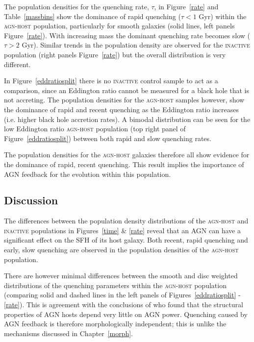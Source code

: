 The population densities for the quenching rate, $\tau$, in Figure~\ref{rate} and Table~\ref{massbins} show the dominance of rapid quenching ($\tau < 1$ Gyr) within the \textsc{agn-host} population, particularly for smooth galaxies (solid lines, left panels Figure~\ref{rate}). With increasing mass the dominant quenching rate becomes slow ($\tau > 2$ Gyr). Similar trends in the population density are observed for the \textsc{inactive} population (right panels Figure~\ref{rate}) but the overall distribution is very different. 

In Figure~\ref{eddratiosplit} there is no \textsc{inactive} control sample to act as a comparison, since an Eddington ratio cannot be measured for a black hole that is not accreting. The population densities for the \textsc{agn-host} samples however, show the dominance of rapid and recent quenching as the Eddington ratio increases (i.e. higher black hole accretion rates). A bimodal distribution can be seen for the low Eddington ratio \textsc{agn-host} population (top right panel of Figure~\ref{eddratiosplit}) between both rapid and slow quenching rates. 

The population densities for the \textsc{agn-host} galaxies therefore all show evidence for the dominance of rapid, recent quenching. This result implies the importance of AGN feedback for the evolution within this population.

\subsection{Discussion}\label{dis}

The differences between the population density distributions of the \textsc{agn-host} and \textsc{inactive} populations in Figures~\ref{time} \& \ref{rate} reveal that an AGN can have a significant effect on the SFH of its host galaxy. Both recent, rapid quenching and early, slow quenching are observed in the population densities of the \textsc{agn-host} population. 

There are however minimal differences between the smooth and disc weighted distributions of the quenching parameters within the \textsc{agn-host} population (comparing solid and dashed lines in the left panels of Figures~\ref{eddratiosplit} - \ref{rate}). This is agreement with the conclusions of \citet{kauffmann03b} who found that the structural properties of AGN hosts depend very little on AGN power. Quenching caused by AGN feedback is therefore morphologically independent; this is unlike the mechanisms discussed in Chapter~\ref{morph}.

